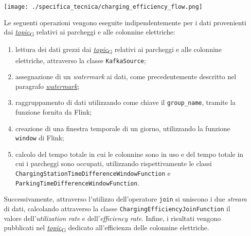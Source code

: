 \begin{center}
	\texttt{[image: ./specifica\_tecnica/charging\_efficiency\_flow.png]}
\end{center}
Le seguenti operazioni vengono eseguite indipendentemente per i dati provenienti dai \href{https://7last.github.io/docs/pb/documentazione-interna/glossario\#topic}{\textit{topic}\textsubscript{G}} relativi ai parcheggi e alle colonnine elettriche:
\begin{enumerate}
	\item lettura dei dati grezzi dai \href{https://7last.github.io/docs/pb/documentazione-interna/glossario\#topic}{\textit{topic}\textsubscript{G}} relativi ai parcheggi e alle colonnine elettriche, attraverso la classe \texttt{KafkaSource};
	\item assegnazione di un \textit{watermark} ai dati, come precedentemente descritto nel paragrafo \hyperref[watermark]{\underline{\textit{watermark}}};
	\item raggruppamento di dati utilizzando come chiave il \texttt{group\_name}, tramite la funzione \texttt{} fornita da Flink;
	\item creazione di una finestra temporale di un giorno, utilizzando la funzione \texttt{window} di Flink;
	\item calcolo del tempo totale in cui le colonnine sono in uso e del tempo totale in cui i parcheggi sono occupati, utilizzando rispettivamente le classi
	      \\\texttt{ChargingStationTimeDifferenceWindowFunction} e \texttt{ParkingTimeDifferenceWindowFunction}.
\end{enumerate}
Successivamente, attraverso l'utilizzo dell'operatore \texttt{join} si uniscono i due \textit{stream} di dati, calcolando
attraverso la classe \texttt{ChargingEfficiencyJoinFunction} il valore dell'\textit{utilization rate} e dell'\textit{efficiency rate}.
Infine, i risultati vengono pubblicati nel \href{https://7last.github.io/docs/pb/documentazione-interna/glossario\#topic}{\textit{topic}\textsubscript{G}} dedicato all'efficienza delle colonnine elettriche.

